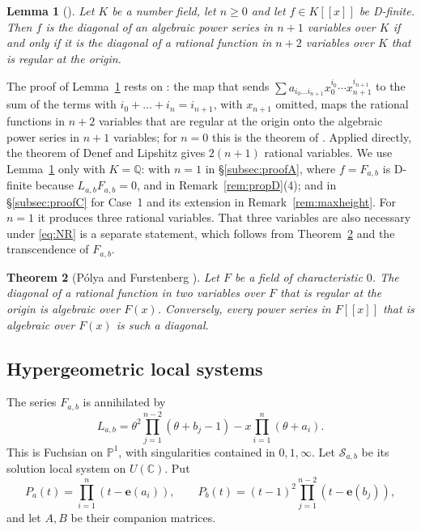 \documentclass[11pt]{amsart}
\newtheorem{theorem}{Theorem}[section]
\newtheorem{lemma}[theorem]{Lemma}
\theoremstyle{definition}
\theoremstyle{remark}
\numberwithin{equation}{section}
\newcommand{\Q}{\mathbb{Q}}
\newcommand{\C}{\mathbb{C}}
\newcommand{\PP}{\mathbb{P}}
\newcommand{\e}{\mathbf{e}}
\newcommand{\cS}{\mathcal{S}}
\newcommand{\Fab}{F_{a,b}}
\newcommand{\Sab}{\cS_{a,b}}
\begin{document}
\begin{lemma}[{\citet[Lemma~3.2]{HarderKramerMiller2025}}]\label{lem:HKM}
Let $K$ be a number field, let $n\ge0$ and let $f\in K[[x]]$ be D-finite. Then $f$ is the diagonal of an algebraic power series in $n+1$ variables over $K$ if and only if it is the diagonal of a rational function in $n+2$ variables over $K$ that is regular at the origin.
\end{lemma}

The proof of Lemma~\ref{lem:HKM} rests on \citet[Theorem~6.2 and Remark~6.4]{DenefLipshitz1987}: the map that sends $\sum a_{i_0\dots i_{n+1}}x_0^{i_0}\cdots x_{n+1}^{i_{n+1}}$ to the sum of the terms with $i_0+\dots+i_n=i_{n+1}$, with $x_{n+1}$ omitted, maps the rational functions in $n+2$ variables that are regular at the origin onto the algebraic power series in $n+1$ variables; for $n=0$ this is the theorem of \citet{Furstenberg1967}. Applied directly, the theorem of Denef and Lipshitz gives $2(n+1)$ rational variables. We use Lemma~\ref{lem:HKM} only with $K=\Q$: with $n=1$ in \S\ref{subsec:proofA}, where $f=\Fab$ is D-finite because $L_{a,b}\Fab=0$, and in Remark~\ref{rem:propD}(4); and in \S\ref{subsec:proofC} for Case~1 and its extension in Remark~\ref{rem:maxheight}. For $n=1$ it produces three rational variables. That three variables are also necessary under \eqref{eq:NR} is a separate statement, which follows from Theorem~\ref{thm:furst} and the transcendence of $\Fab$.

\begin{theorem}[{P\'olya and Furstenberg \citep{Polya1922,Furstenberg1967}}]\label{thm:furst}
Let $F$ be a field of characteristic $0$. The diagonal of a rational function in two variables over $F$ that is regular at the origin is algebraic over $F(x)$. Conversely, every power series in $F[[x]]$ that is algebraic over $F(x)$ is such a diagonal.
\end{theorem}

\subsection{Hypergeometric local systems}\label{subsec:hyp}
The series $\Fab$ is annihilated by
\begin{equation}\label{eq:L}
L_{a,b}=\theta^2\prod_{j=1}^{n-2}(\theta+b_j-1)-x\prod_{i=1}^{n}(\theta+a_i).
\end{equation}
This is Fuchsian on $\PP^1$, with singularities contained in $0,1,\infty$. Let $\Sab$ be its solution local system on $U(\C)$. Put
\[
P_a(t)=\prod_{i=1}^{n}(t-\e(a_i)),\qquad
P_b(t)=(t-1)^2\prod_{j=1}^{n-2}(t-\e(b_j)),
\]
and let $A,B$ be their companion matrices.
\end{document}
